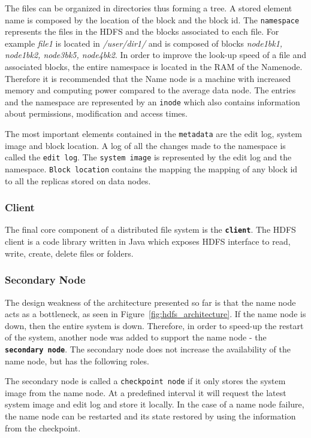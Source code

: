 \documentclass{sig-alternate}
\begin{document}
The files can be organized in directories thus forming a tree. A stored element name is composed by the location of the block and the block id.
The \texttt{namespace} represents the files in the HDFS and the blocks associated to each file. For example \textit{file1} is located in \textit{/user/dir1/} and is composed of blocks \textit{node1bk1, node1bk2, node3bk5, node4bk2}.
In order to improve the look-up speed of a file and associated blocks, the entire namespace is located in the RAM of the Namenode. Therefore it is recommended that the Name node is a machine with increased memory and computing power compared to the average data node.
The entries and the namespace are represented by an \texttt{inode} which also contains information about permissions, modification and access times.

The most important elements contained in the \texttt{metadata} are the edit log, system image and block location.
A log of all the changes made to the namespace is called the \texttt{edit log}. The \texttt{system image} is represented by the edit log and the namespace. \texttt{Block location} contains the mapping the mapping of any block id to all the replicas stored on data nodes.

\subsubsection{Client}
The final core component of a distributed file system is the \textbf{\texttt{client}}.
The HDFS client is a code library written in Java which 
exposes HDFS interface to
read, write, create, delete files or folders. 

\subsubsection{Secondary Node}
The design weakness of the architecture presented so far is that the name node acts as a bottleneck, as seen in Figure~\ref{fig:hdfs_architecture}.
If the name node is down, then the entire system is down.
Therefore, in order to speed-up the restart of the system, another node was added to support the name node - the \textbf{\texttt{secondary node}}. The secondary node does not increase the availability of the name node, but has the following roles.

The secondary node is called a \texttt{checkpoint node} if it only stores the system image from the name node. At a predefined interval it will request the latest system image and edit log and store it locally. In the case of a name node failure, the name node can be restarted and its state restored by using the information from the checkpoint. 
\end{document}
